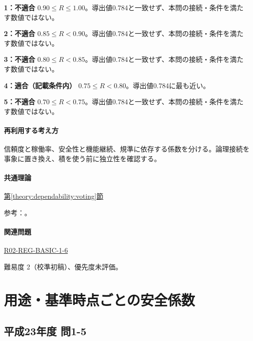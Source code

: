 \noindent\textbf{1：不適合} \(0.90\le R\le1.00\)。導出値0.784と一致せず、本問の接続・条件を満たす数値ではない。\par

\noindent\textbf{2：不適合} \(0.85\le R<0.90\)。導出値0.784と一致せず、本問の接続・条件を満たす数値ではない。\par

\noindent\textbf{3：不適合} \(0.80\le R<0.85\)。導出値0.784と一致せず、本問の接続・条件を満たす数値ではない。\par

\noindent\textbf{4：適合（記載条件内）} \(0.75\le R<0.80\)。導出値0.784に最も近い。\par

\noindent\textbf{5：不適合} \(0.70\le R<0.75\)。導出値0.784と一致せず、本問の接続・条件を満たす数値ではない。\par

\paragraph{再利用する考え方} 信頼度と稼働率、安全性と機能継続、規準に依存する係数を分ける。論理接続を事象に置き換え、積を使う前に独立性を確認する。

\paragraph{共通理論} \hyperref[theory:dependability:voting]{第\ref*{theory:dependability:voting}節}

\par 参考：\cite{reliability_nist_voting}。

\paragraph{関連問題} \hyperref[q:r02-reg-basic-1-6]{R02-REG-BASIC-1-6}

\par 難易度 2（校準初稿）、優先度未評価。

\section{用途・基準時点ごとの安全係数}

\subsection{平成23年度 問1-5}
\label{q:h23-reg-basic-1-5}

